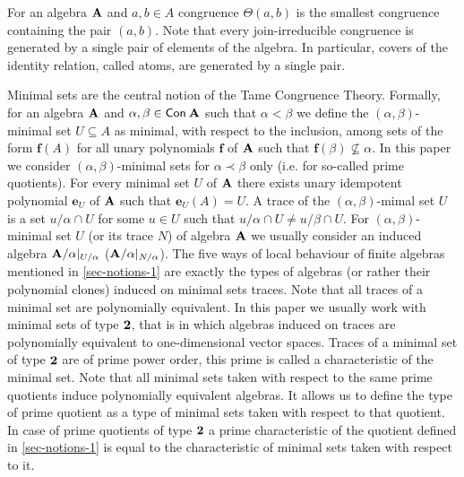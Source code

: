 \documentclass[11pt,a4paper]{amsart}
\newcommand{\m}[1]{{\uppercase {\bf{#1}}}}
\newcommand{\con}[1]{{\sf Con\:\m{#1}}}
\newcommand{\po}[1]{{\mathbf {#1}}}
\newcommand{\tn} [1]{{\bf {#1}}}
\begin{document}
 For an algebra $\m A$ and $a,b\in A$ congruence $\Theta(a,b)$ is the smallest congruence containing the pair $(a,b)$. Note that every join-irreducible congruence is generated by a single pair of elements of the algebra. In particular, covers of the identity relation, called atoms, are generated by a single pair. 

 Minimal sets are the central notion of the Tame Congruence Theory. Formally, for an algebra $\m A$ and $\alpha,\beta\in \con {\m A}$ such that $\alpha < \beta$ we define the $(\alpha,\beta)$-minimal set $U\subseteq A$ as minimal, with respect to the inclusion, among sets of the form $\po f(A)$ for all unary polynomials  $\po f$ of  $\m A$ such that $\po f(\beta)\not\subseteq\alpha$. In this paper we consider $(\alpha,\beta)$-minimal sets for $\alpha\prec\beta$ only (i.e. for so-called prime quotients).  For every minimal set $U$ of $\m A$ there exists unary idempotent polynomial $\po e_U$ of $\m A$ such that $\po e_U(A)=U$. A trace of the $(\alpha,\beta)$-mimal set $U$ is a set $u/\alpha\cap U$ for some $u\in U$ such that $u/\alpha\cap U\not=u/\beta\cap U$. For $(\alpha, \beta)$-minimal set $U$ (or its trace $N$) of algebra $\m A$ we usually consider an induced algebra $\m A/\alpha|_{U/\alpha}$ ($\m A/\alpha|_{N/\alpha}$). The five ways of local behaviour of finite algebras mentioned in \cref{sec-notions-1} are exactly the types of algebras (or rather their polynomial clones) induced on minimal sets traces. Note that all traces of a minimal set are polynomially equivalent. In this paper we usually work with minimal sets of type $\tn 2$, that is in which algebras induced on traces are polynomially equivalent to one-dimensional vector spaces. Traces of a minimal set of type $\tn 2$ are of prime power order, this prime is called a characteristic of the minimal set. Note that all minimal sets taken with respect to the same prime quotients induce polynomially equivalent algebras. It allows us to define the type of prime quotient as a type of minimal sets taken with respect to that quotient. In case of prime quotients of type $\tn 2$ a prime characteristic of the quotient defined in \cref{sec-notions-1} is equal to the characteristic of minimal sets taken with respect to it.
\end{document}
